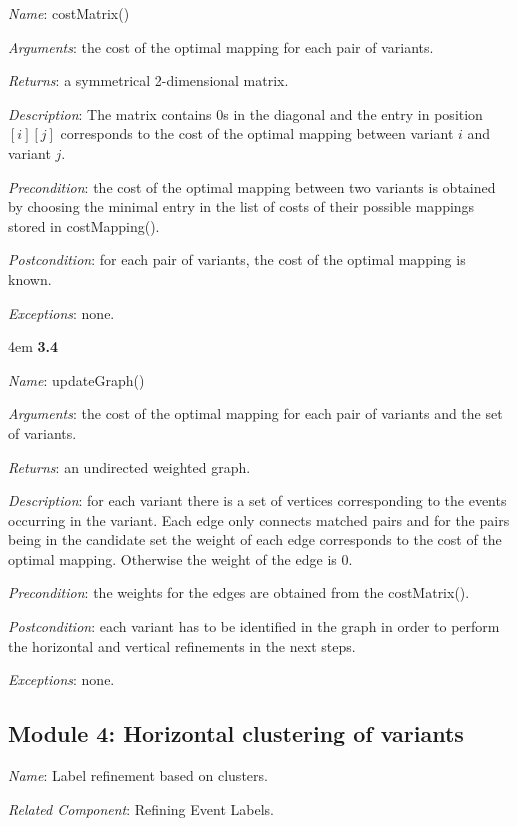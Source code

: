 \documentclass[notitlepage]{article}
\begin{document}
\begin{flushleft}
\textit{Name}: costMatrix()

\textit{Arguments}: the cost of the optimal mapping for each pair of variants.

\textit{Returns}: a symmetrical 2-dimensional matrix.

\textit{Description}: The matrix contains 0s in the diagonal and the entry in position $[i][j]$ corresponds to the cost of the optimal mapping between variant $i$ and variant $j$. 

\textit{Precondition}: the cost of the optimal mapping between two variants is obtained by choosing the minimal entry in the list of costs of their possible mappings stored in costMapping().

\textit{Postcondition}: for each pair of variants, the cost of the optimal mapping is known.

\textit{Exceptions}: none.
\par
\endgroup


\medskip

\par
\begingroup
\leftskip4em
\textbf{3.4} 

\textit{Name}: updateGraph()

\textit{Arguments}: the cost of the optimal mapping for each pair of variants and the set of variants.

\textit{Returns}: an undirected weighted graph.

\textit{Description}: for each variant there is a set of vertices corresponding to the events occurring in the variant. Each edge only connects matched pairs and for the pairs being in the candidate set the weight of each edge corresponds to the cost of the optimal mapping. Otherwise the weight of the edge is 0.

\textit{Precondition}: the weights for the edges are obtained from the costMatrix().

\textit{Postcondition}: each variant has to be identified in the graph in order to perform the horizontal and vertical refinements in the next steps.

\textit{Exceptions}: none.
\par
\endgroup


\subsection{Module 4: Horizontal clustering of variants}
\textit{Name}: Label refinement based on clusters.

\textit{Related Component}: Refining Event Labels.


\end{flushleft}
\end{document}
